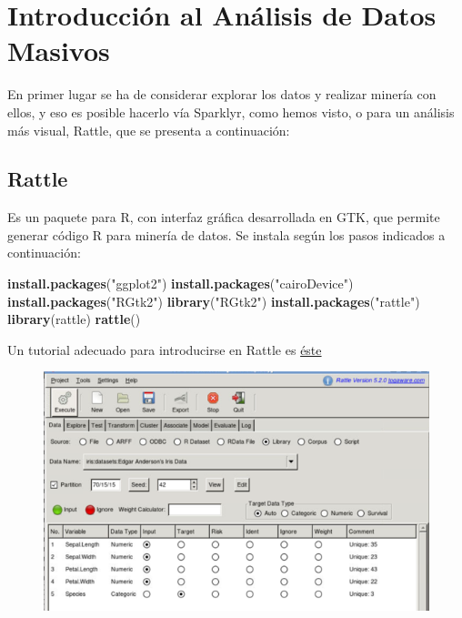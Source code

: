 \documentclass[]{book}
\newenvironment{Shaded}{\begin{snugshade}}{\end{snugshade}}
\newcommand{\KeywordTok}[1]{\textcolor[rgb]{0.13,0.29,0.53}{\textbf{#1}}}
\newcommand{\StringTok}[1]{\textcolor[rgb]{0.31,0.60,0.02}{#1}}
\newcommand{\NormalTok}[1]{#1}
\begin{document}
\section{Introducción al Análisis de Datos
Masivos}\label{introducciuxf3n-al-anuxe1lisis-de-datos-masivos}

En primer lugar se ha de considerar explorar los datos y realizar
minería con ellos, y eso es posible hacerlo vía Sparklyr, como hemos
visto, o para un análisis más visual, Rattle, que se presenta a
continuación:

\subsection{Rattle}\label{rattle}

Es un paquete para R, con interfaz gráfica desarrollada en GTK, que
permite generar código R para minería de datos. Se instala según los
pasos indicados a continuación:

\begin{Shaded}
\begin{Highlighting}[]
\KeywordTok{install.packages}\NormalTok{(}\StringTok{"ggplot2"}\NormalTok{)}
\KeywordTok{install.packages}\NormalTok{(}\StringTok{"cairoDevice"}\NormalTok{)}
\KeywordTok{install.packages}\NormalTok{(}\StringTok{"RGtk2"}\NormalTok{)}
\KeywordTok{library}\NormalTok{(}\StringTok{"RGtk2"}\NormalTok{)}
\KeywordTok{install.packages}\NormalTok{(}\StringTok{"rattle"}\NormalTok{)}
\KeywordTok{library}\NormalTok{(rattle)}
\KeywordTok{rattle}\NormalTok{()}
\end{Highlighting}
\end{Shaded}

Un tutorial adecuado para introducirse en Rattle es
\href{https://www.dummies.com/programming/using-rattle-iris-r-programming/}{éste}

\begin{figure}
\centering
\includegraphics{images/T3-rattle1.png}
\caption{}
\end{figure}
\end{document}
